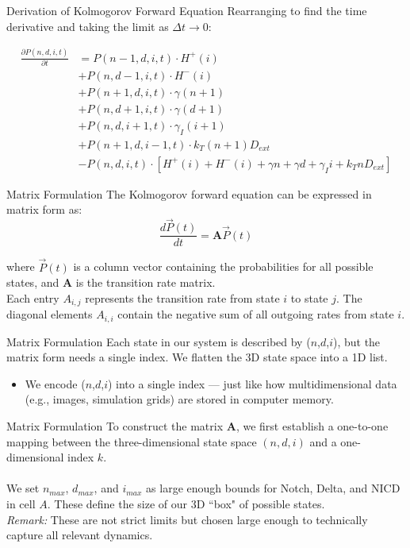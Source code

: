 \documentclass[aspectratio=169]{beamer}
\begin{document}
\begin{frame}{Derivation of Kolmogorov Forward Equation}
Rearranging to find the time derivative and taking the limit as $\Delta t \rightarrow 0$:

\begin{align*}
\frac{\partial P(n,d,i,t)}{\partial t} &= P(n-1,d,i,t) \cdot H^+(i) \\
&+ P(n,d-1,i,t) \cdot H^-(i) \\
&+ P(n+1,d,i,t) \cdot \gamma(n+1) \\
&+ P(n,d+1,i,t) \cdot \gamma(d+1) \\
&+ P(n,d,i+1,t) \cdot \gamma_I(i+1) \\
&+ P(n+1,d,i-1,t) \cdot k_T(n+1)D_{ext} \\
&- P(n,d,i,t) \cdot [H^+(i) + H^-(i) + \gamma n + \gamma d + \gamma_I i + k_T n D_{ext}]
\end{align*}

\end{frame}

\begin{frame}{Matrix Formulation}
The Kolmogorov forward equation can be expressed in matrix form as:
\[
\frac{d\vec{P}(t)}{dt} = \mathbf{A} \vec{P}(t)
\]

where $\vec{P}(t)$ is a column vector containing the probabilities for all possible states, and $\mathbf{A}$ is the transition rate matrix.\\
Each entry $A_{i,j}$ represents the transition rate from state $i$ to state $j$. The diagonal elements $A_{i,i}$ contain the negative sum of all outgoing rates from state $i$.

\end{frame}

\begin{frame}{Matrix Formulation}
Each state in our system is described by ($n$,$d$,$i$), but the matrix form needs a single index.
\vfill
\pause
We flatten the 3D state space into a 1D list.\\
\begin{itemize}
    \item We encode ($n$,$d$,$i$) into a single index — just like how multidimensional data (e.g., images, simulation grids) are stored in computer memory.
\end{itemize}
\end{frame}

\begin{frame}{Matrix Formulation}
To construct the matrix $\mathbf{A}$, we first establish a one-to-one mapping between the three-dimensional state space $(n,d,i)$ and a one-dimensional index $k$. \\~\\
We set $n_{max}$, $d_{max}$, and $i_{max}$ as large enough bounds for Notch, Delta, and NICD in cell $A$. These define the size of our 3D ``box" of possible states. \\
\textit{Remark:} These are not strict limits but chosen large enough to technically capture all relevant dynamics.
\end{frame}
\end{document}
